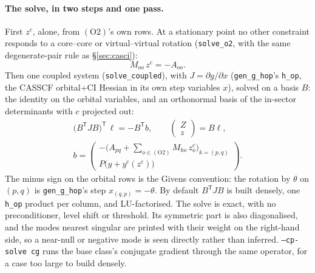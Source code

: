 \documentclass[11pt]{article}
\newcommand{\code}[1]{\texttt{#1}}
\newcommand{\cons}[1]{\ensuremath{(\mathrm{#1})}}
\begin{document}
\paragraph{The solve, in two steps and one pass.} First $z^c$, alone, from
\cons{O2}'s own rows. At a stationary point no other constraint responds to a
core--core or virtual--virtual rotation (\code{solve\_o2}, with the same
degenerate-pair rule as \S\ref{sec:casci}):
\begin{equation}
  M_{oo}\,z^c = -A_{oo}.
  \label{eq:zc}
\end{equation}
Then one coupled system (\code{solve\_coupled}), with $J = \partial g/\partial
x$ (\code{gen\_g\_hop}'s \code{h\_op}, the CASSCF orbital+CI Hessian in its own
step variables $x$), solved on a basis $B$: the identity on the orbital
variables, and an orthonormal basis of the in-sector determinants with $c$
projected out:
\begin{equation}
\begin{gathered}
  \bigl(B^{\mathsf T}JB\bigr)^{\mathsf T}\,\ell = -B^{\mathsf T}b,\qquad
  \begin{pmatrix} Z\\ z\end{pmatrix} = B\ell,\\
  b = \begin{pmatrix} -\bigl(A_{pq} + \sum_{o\in\cons{O2}} M_{ko}\,z^c_o\bigr)_{k=(p,q)}\\[2pt]
                      P\bigl(y + y^c(z^c)\bigr)\end{pmatrix}.
\end{gathered}
  \label{eq:cp}
\end{equation}
The minus sign on the orbital rows is the Givens convention: the rotation by
$\theta$ on $(p,q)$ is \code{gen\_g\_hop}'s step $x_{(q,p)} = -\theta$. By
default $B^{\mathsf T}JB$ is built densely, one \code{h\_op} product per
column, and LU-factorised. The solve is exact, with no preconditioner, level
shift or threshold. Its symmetric part is also diagonalised, and the modes
nearest singular are printed with their weight on the right-hand side, so a
near-null or negative mode is seen directly rather than inferred.
\code{--cp-solve cg} runs the base class's conjugate gradient through the same
operator, for a case too large to build densely.
\end{document}
